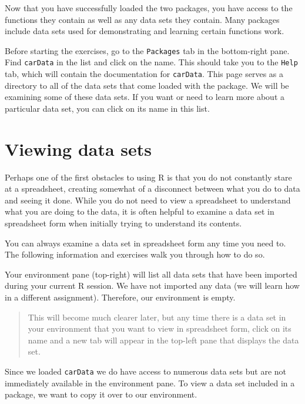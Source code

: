 \documentclass[
]{book}
\begin{document}
Now that you have successfully loaded the two packages, you have access to the functions they contain as well as any data sets they contain. Many packages include data sets used for demonstrating and learning certain functions work.

Before starting the exercises, go to the \texttt{Packages} tab in the bottom-right pane. Find \texttt{carData} in the list and click on the name. This should take you to the \texttt{Help} tab, which will contain the documentation for \texttt{carData}. This page serves as a directory to all of the data sets that come loaded with the package. We will be examining some of these data sets. If you want or need to learn more about a particular data set, you can click on its name in this list.

\hypertarget{viewing-data-sets}{%
\section{Viewing data sets}\label{viewing-data-sets}}

Perhaps one of the first obstacles to using R is that you do not constantly stare at a spreadsheet, creating somewhat of a disconnect between what you do to data and seeing it done. While you do not need to view a spreadsheet to understand what you are doing to the data, it is often helpful to examine a data set in spreadsheet form when initially trying to understand its contents.

You can always examine a data set in spreadsheet form any time you need to. The following information and exercises walk you through how to do so.

Your environment pane (top-right) will list all data sets that have been imported during your current R session. We have not imported any data (we will learn how in a different assignment). Therefore, our environment is empty.

\begin{quote}
This will become much clearer later, but any time there is a data set in your environment that you want to view in spreadsheet form, click on its name and a new tab will appear in the top-left pane that displays the data set.
\end{quote}

Since we loaded \texttt{carData} we do have access to numerous data sets but are not immediately available in the environment pane. To view a data set included in a package, we want to copy it over to our environment.
\end{document}
